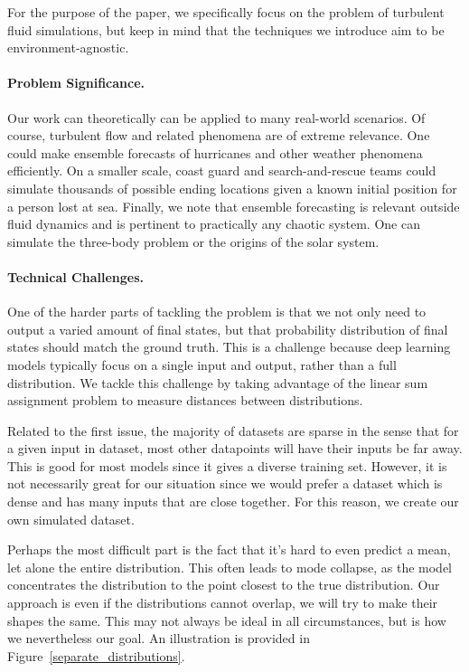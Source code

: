 \documentclass{article}
\begin{document}
For the purpose of the paper, we specifically focus on the problem of turbulent fluid simulations, but keep in mind that the techniques we introduce aim to be environment-agnostic.
\paragraph{Problem Significance.}
Our work can theoretically can be applied to many real-world scenarios. Of course, turbulent flow and related phenomena are of extreme relevance. One could make ensemble forecasts of hurricanes and other weather phenomena efficiently. On a smaller scale, coast guard and search-and-rescue teams could simulate thousands of possible ending locations given a known initial position for a person lost at sea. Finally, we note that ensemble forecasting is relevant outside fluid dynamics and is pertinent to practically any chaotic system. One can simulate the three-body problem or the origins of the solar system.
\paragraph{Technical Challenges.}
One of the harder parts of tackling the problem is that we not only need to output a varied amount of final states, but that probability distribution of final states should match the ground truth. This is a challenge because deep learning models typically focus on a single input and output, rather than a full distribution. We tackle this challenge by taking advantage of the linear sum assignment problem to measure distances between distributions.

Related to the first issue, the majority of datasets are sparse in the sense that for a given input in dataset, most other datapoints will have their inputs be far away. This is good for most models since it gives a diverse training set. However, it is not necessarily great for our situation since we would prefer a dataset which is dense and has many inputs that are close together. For this reason, we create our own simulated dataset.

Perhaps the most difficult part is the fact that it's hard to even predict a mean, let alone the entire distribution. This often leads to mode collapse, as the model concentrates the distribution to the point closest to the true distribution. Our approach is even if the distributions cannot overlap, we will try to make their shapes the same. This may not always be ideal in all circumstances, but is how we nevertheless our goal. An illustration is provided in Figure~\ref{separate_distributions}.
\end{document}
